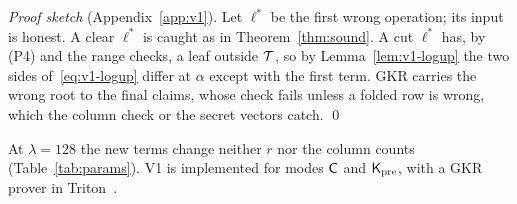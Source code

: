 \noindent\emph{Proof sketch} (Appendix~\ref{app:v1}). Let $\ell^\ast$ be the first wrong
operation; its input is honest. A clear $\ell^\ast$ is caught as in Theorem~\ref{thm:sound}. A cut
$\ell^\ast$ has, by (P4) and the range checks, a leaf outside $\mathcal{T}$, so by
Lemma~\ref{lem:v1-logup} the two sides of~\eqref{eq:v1-logup} differ at $\alpha$ except with the
first term. GKR carries the wrong root to the final claims, whose check fails unless a folded row
is wrong, which the column check or the secret vectors catch. \qed

\smallskip
\noindent At $\lambda=128$ the new terms change neither $r$ nor the column counts
(Table~\ref{tab:params}). V1 is implemented for modes $\mathsf{C}$ and $\mathsf{K}_{\mathrm{pre}}$, with a GKR prover in
Triton~\cite{tillet2019triton}.
